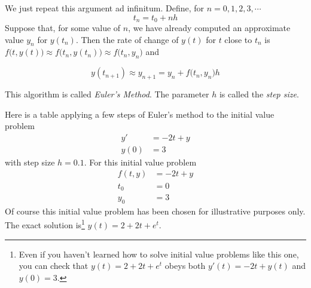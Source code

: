 We just repeat this argument ad infinitum. Define, for $n=0,1,2,3,\cdots$
\begin{equation*}
t_n=t_0+nh
\end{equation*}
Suppose that, for some value of $n$, we have already computed an approximate
value $y_n$ for $y(t_n)$. Then the rate of change of $y(t)$
for $t$ close to $t_n$ is 
$f\big(t,y(t)\big)\approx f\big(t_n,y(t_n)\big)\approx f\big(t_n,y_n\big)$
and
\begin{impeqn}\label{Eul}
\begin{equation*}
y(t_{n+1})\approx y_{n+1}=y_n+f\big(t_n,y_n\big)h
\end{equation*}
\end{impeqn}\noindent
This algorithm is called \emph{Euler's Method}. The parameter $h$ is called
the \emph{step size}. 

Here is a table applying a few steps of Euler's method
to the initial value problem 
\begin{align*}
y'&=-2t+y \\
y(0) & = 3
\end{align*}
with step size $h=0.1$. For this initial value problem
\begin{align*}
f(t,y)&=-2t+y \\
t_0&=0 \\
y_0&=3
\end{align*}
Of course this initial value problem has been chosen for illustrative purposes
only. The exact solution is\footnote{Even if you haven't learned how to solve initial value problems like this one, you can check that $y(t)=2+2t+e^t$ obeys both $y'(t)=-2t+y(t)$ and $y(0)=3$.} $y(t)=2+2t+e^t$.

